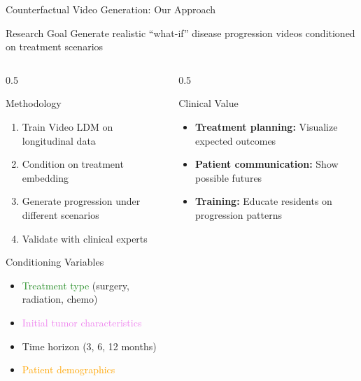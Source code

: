 \documentclass[aspectratio=169]{beamer}
\begin{document}
\begin{frame}{Counterfactual Video Generation: Our Approach}
    \begin{block}{Research Goal}
        Generate realistic ``what-if'' disease progression videos conditioned on treatment scenarios
    \end{block}
    
    \begin{columns}
        \begin{column}{0.5\textwidth}
            \begin{block}{Methodology}
                \begin{enumerate}
                    \item Train Video LDM on longitudinal data
                    \item Condition on treatment embedding
                    \item Generate progression under different scenarios
                    \item Validate with clinical experts
                \end{enumerate}
            \end{block}
            
            \begin{block}{Conditioning Variables}
                \begin{itemize}
                    \item \textcolor{ForestGreen}{Treatment type} (surgery, radiation, chemo)
                    \item \textcolor{violet}{Initial tumor characteristics}
                    \item \textcolor{BrickRed}{Time horizon} (3, 6, 12 months)
                    \item \textcolor{Orange}{Patient demographics}
                \end{itemize}
            \end{block}
        \end{column}
        \begin{column}{0.5\textwidth}
            \begin{block}{Clinical Value}
                \begin{itemize}
                    \item \textbf{Treatment planning:} Visualize expected outcomes
                    \item \textbf{Patient communication:} Show possible futures
                    \item \textbf{Training:} Educate residents on progression patterns
                \end{itemize}
            \end{block}
            

\end{column}
\end{columns}
\end{frame}
\end{document}
